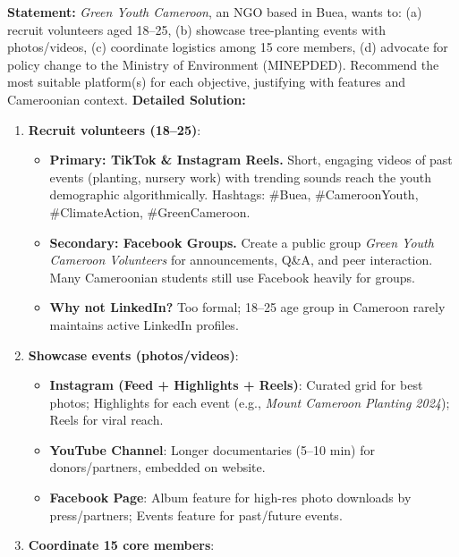 \documentclass[11pt]{article}
\begin{document}
\begin{exoresolu}
    \textbf{Statement:} \textit{Green Youth Cameroon}, an NGO based in Buea, wants to: (a) recruit volunteers aged 18–25, (b) showcase tree-planting events with photos/videos, (c) coordinate logistics among 15 core members, (d) advocate for policy change to the Ministry of Environment (MINEPDED). Recommend the most suitable platform(s) for each objective, justifying with features and Cameroonian context.
    \tcblower
    \textbf{Detailed Solution:}
    \begin{enumerate}
        \item \textbf{Recruit volunteers (18–25)}:
              \begin{itemize}
                  \item \textbf{Primary: TikTok \& Instagram Reels.} Short, engaging videos of past events (planting, nursery work) with trending sounds reach the youth demographic algorithmically. Hashtags: \#Buea, \#CameroonYouth, \#ClimateAction, \#GreenCameroon.
                  \item \textbf{Secondary: Facebook Groups.} Create a public group \textit{Green Youth Cameroon Volunteers} for announcements, Q\&A, and peer interaction. Many Cameroonian students still use Facebook heavily for groups.
                  \item \textbf{Why not LinkedIn?} Too formal; 18–25 age group in Cameroon rarely maintains active LinkedIn profiles.
              \end{itemize}
        \item \textbf{Showcase events (photos/videos)}:
              \begin{itemize}
                  \item \textbf{Instagram (Feed + Highlights + Reels)}: Curated grid for best photos; Highlights for each event (e.g., \textit{Mount Cameroon Planting 2024}); Reels for viral reach.
                  \item \textbf{YouTube Channel}: Longer documentaries (5–10 min) for donors/partners, embedded on website.
                  \item \textbf{Facebook Page}: Album feature for high-res photo downloads by press/partners; Events feature for past/future events.
              \end{itemize}
        \item \textbf{Coordinate 15 core members}:
              \begin{itemize}

\end{itemize}
\end{enumerate}
\end{exoresolu}
\end{document}
